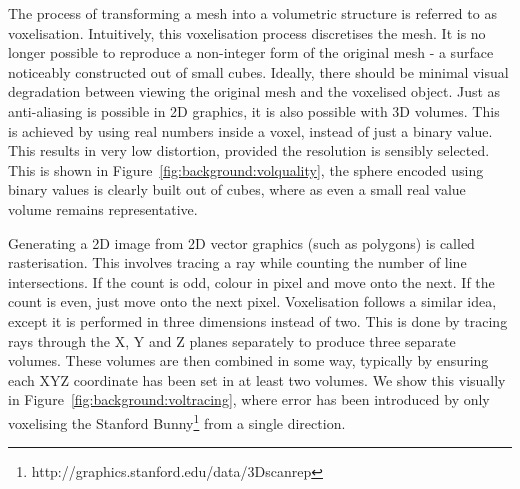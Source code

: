 The process of transforming a mesh into a volumetric structure is
referred to as voxelisation. Intuitively, this voxelisation process
discretises the mesh. It is no longer possible to reproduce a
non-integer form of the original mesh - a surface noticeably
constructed out of small cubes. Ideally, there should be minimal
visual degradation between viewing the original mesh and the voxelised
object.  Just as anti-aliasing is possible in 2D graphics, it is also
possible with 3D volumes. This is achieved by using real numbers
inside a voxel, instead of just a binary value.  This results in very
low distortion, provided the resolution is sensibly selected. This is
shown in Figure~\ref{fig:background:volquality}, the sphere encoded
using binary values is clearly built out of cubes, where as even a
small real value volume remains representative.

Generating a 2D image from 2D vector graphics (such as polygons) is
called rasterisation. This involves tracing a ray while counting the
number of line intersections. If the count is odd, colour in pixel and
move onto the next. If the count is even, just move onto the next
pixel. Voxelisation follows a similar idea, except it is performed in
three dimensions instead of two. This is done by tracing rays through
the X, Y and Z planes separately to produce three separate
volumes. These volumes are then combined in some way, typically by
ensuring each XYZ coordinate has been set in at least two volumes. We
show this visually in Figure~\ref{fig:background:voltracing}, where
error has been introduced by only voxelising the Stanford
Bunny\footnote{http://graphics.stanford.edu/data/3Dscanrep} from a
single direction.

